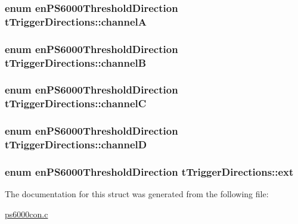 \subsubsection[{\texorpdfstring{channelA}{channelA}}]{\setlength{\rightskip}{0pt plus 5cm}enum en\+P\+S6000\+Threshold\+Direction t\+Trigger\+Directions\+::channelA}\hypertarget{structtTriggerDirections_a7201a55131960cfa37eb43457ba04fe5}{}\label{structtTriggerDirections_a7201a55131960cfa37eb43457ba04fe5}
\subsubsection[{\texorpdfstring{channelB}{channelB}}]{\setlength{\rightskip}{0pt plus 5cm}enum en\+P\+S6000\+Threshold\+Direction t\+Trigger\+Directions\+::channelB}\hypertarget{structtTriggerDirections_a0daca55257dc21c3a975b49c4934d86a}{}\label{structtTriggerDirections_a0daca55257dc21c3a975b49c4934d86a}
\subsubsection[{\texorpdfstring{channelC}{channelC}}]{\setlength{\rightskip}{0pt plus 5cm}enum en\+P\+S6000\+Threshold\+Direction t\+Trigger\+Directions\+::channelC}\hypertarget{structtTriggerDirections_a0f14ba2bc0ca2107dd6d869fa94afba7}{}\label{structtTriggerDirections_a0f14ba2bc0ca2107dd6d869fa94afba7}
\subsubsection[{\texorpdfstring{channelD}{channelD}}]{\setlength{\rightskip}{0pt plus 5cm}enum en\+P\+S6000\+Threshold\+Direction t\+Trigger\+Directions\+::channelD}\hypertarget{structtTriggerDirections_a6e5858ded0886d1c9acdc8f136f5001a}{}\label{structtTriggerDirections_a6e5858ded0886d1c9acdc8f136f5001a}
\subsubsection[{\texorpdfstring{ext}{ext}}]{\setlength{\rightskip}{0pt plus 5cm}enum en\+P\+S6000\+Threshold\+Direction t\+Trigger\+Directions\+::ext}\hypertarget{structtTriggerDirections_a7374f5529554bb2f4afc51b864803367}{}\label{structtTriggerDirections_a7374f5529554bb2f4afc51b864803367}


The documentation for this struct was generated from the following file\+:\begin{DoxyCompactItemize}
\item 
\hyperlink{ps6000con_8c}{ps6000con.\+c}\end{DoxyCompactItemize}
